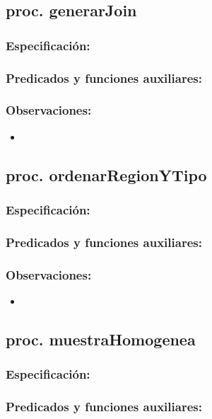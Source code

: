 \documentclass[a4paper]{article}
\begin{document}
\pagebreak
\subsection{proc. generarJoin}
    \subsubsection{Especificaci\'on:}    
    \subsubsection{Predicados y funciones auxiliares:}
    \subsubsection{Observaciones:}
        \begin{itemize}
            \item
        \end{itemize}

\pagebreak
\subsection{proc. ordenarRegionYTipo}
    \subsubsection{Especificaci\'on:}    
    \subsubsection{Predicados y funciones auxiliares:}
    \subsubsection{Observaciones:}
        \begin{itemize}
            \item
        \end{itemize}

\pagebreak
\subsection{proc. muestraHomogenea}
    \subsubsection{Especificaci\'on:}    
    \subsubsection{Predicados y funciones auxiliares:}
\end{document}
